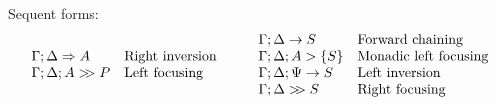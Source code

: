 \documentclass{sig-alt}
\begin{document}
\noindent Sequent forms:
$$
\begin{array}{ll}
  \Gamma;\Delta\Rightarrow A & \hbox{Right inversion} \\
  \Gamma;\Delta;A\mathrel{>\!\! >}P & \hbox{Left focusing} \\
\end{array}
\qquad
\begin{array}{ll}
  \Gamma;\Delta\rightarrow S & \hbox{Forward chaining} \\
  \Gamma;\Delta;A\mathrel>\{S\} & \hbox{Monadic left focusing} \\
  \Gamma;\Delta;\Psi\rightarrow S & \hbox{Left inversion} \\
  \Gamma;\Delta\mathrel{>\!\! >}S & \hbox{Right focusing} \\
\end{array}
$$
\end{document}
